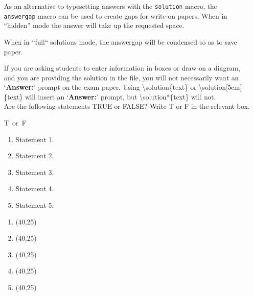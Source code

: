 \documentclass[12pt,a4paper]{article} %
\begin{document}
\begin{question}{5}
As an alternative to typesetting answers with the \texttt{solution} macro, the \texttt{answergap} macro can be used to create gaps for write-on papers. When in ``hidden'' mode the answer will take up the requested space.

When in ``full`` solutions mode, the answergap will be condensed so as to save paper.
\answergap{15cm}
\end{question}

\begin{question}{5} 
If you are asking students to enter information in boxes or draw on a diagram, and you are providing the solution in the file, you will not necessarily want an `{\bf Answer:}' prompt on the exam paper. Using \textbackslash solution\{text\} or \textbackslash solution[5cm]\{text\} will insert an `{\bf Answer:}' prompt, but \textbackslash solution*\{text\} will not.\\

Are the following statements TRUE or FALSE? Write T or F in the relevant box. 
	
	\hspace*{14.4cm} \mbox{T or F} 
	
	\hfill
	\begin{minipage}[t]{.75\textwidth}
		\begin{enumerate}
			\item Statement 1. 
			\item Statement 2.  
			\item Statement 3. 
			\item Statement 4. 
			\item Statement 5. 
			
		\end{enumerate} 
	\end{minipage}
	\hfill
	\begin{minipage}[t]{.12\textwidth}
		\vspace*{-.8cm}
		\begin{enumerate}
			\item[]  \framebox(40,25){} 
			\vspace*{-1.5cm}
			\item[]  \framebox(40,25){}
			\vspace*{-1.5cm}
			
			\item[]  \framebox(40,25){}
			\vspace*{-1.5cm}
			
			\item[]  \framebox(40,25){}
			\vspace*{-1.5cm}
			\item[]  \framebox(40,25){}
		\end{enumerate} 
	\vspace*{1cm}
	\end{minipage}
\end{question}
\end{document}
